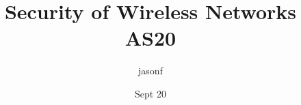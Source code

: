 \documentclass[a4paper, 8pt]{article}
\title{Security of Wireless Networks AS20}
\author{jasonf}
\date{Sept 20}
\begin{document}
\begin{multicols*}{2}
\maketitle
\tableofcontents












\end{multicols*}
\end{document}

